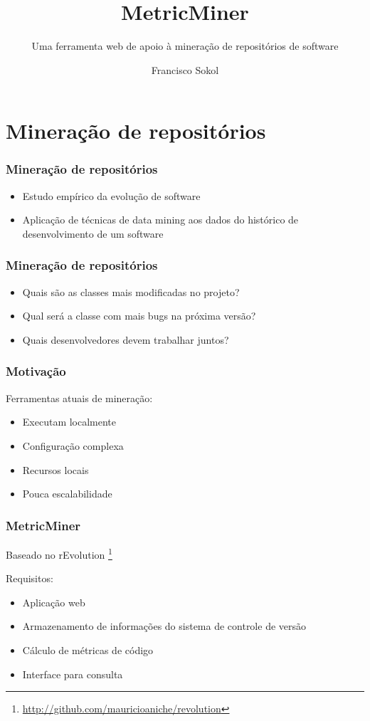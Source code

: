\documentclass[brazil]{beamer}
\title%
{MetricMiner}
\subtitle{Uma ferramenta
web de apoio à mineração de
repositórios de software}
\institute {
Orientador: Marco Aurélio Gerosa\\ 
Co-orientador: Mauricio Finavaro Aniche
}
\author
{Francisco Sokol}
\begin{document}
\frame{\titlepage}

	\section{Mineração de repositórios}

	\begin{frame}
		\frametitle{Mineração de repositórios}
		\begin{itemize}
			\item Estudo empírico da evolução de software 
			\item Aplicação de técnicas de data mining aos dados do histórico de desenvolvimento de um software
		\end{itemize}
	\end{frame}

	\begin{frame}
		\frametitle{Mineração de repositórios}
		\begin{itemize}
			\item Quais são as classes mais modificadas no projeto?
			\item Qual será a classe com mais bugs na próxima versão?
			\item Quais desenvolvedores devem trabalhar juntos?
		\end{itemize}
	\end{frame}

	\begin{frame}
		\frametitle{Motivação}
		Ferramentas atuais de mineração:
		\begin{itemize}
			\item Executam localmente
			\item Configuração complexa
			\item Recursos locais
			\item Pouca escalabilidade
		\end{itemize}
	\end{frame}

	\begin{frame}
		\frametitle{MetricMiner}
		Baseado no rEvolution \footnote{\url{http://github.com/mauricioaniche/revolution}}\vspace{0.5cm}

		Requisitos:
		\begin{itemize}
			\item Aplicação web
			\item Armazenamento de informações do sistema de controle de versão
			\item Cálculo de métricas de código
			\item Interface para consulta
		\end{itemize}
	\end{frame}
\end{document}
